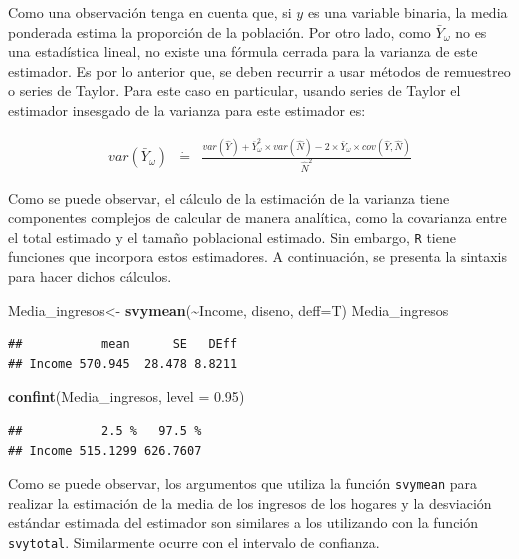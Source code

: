 \documentclass[
  spanish,
  12pt,
]{book}
\newenvironment{Shaded}{\begin{snugshade}}{\end{snugshade}}
\newcommand{\AttributeTok}[1]{\textcolor[rgb]{0.13,0.29,0.53}{#1}}
\newcommand{\FloatTok}[1]{\textcolor[rgb]{0.00,0.00,0.81}{#1}}
\newcommand{\FunctionTok}[1]{\textcolor[rgb]{0.13,0.29,0.53}{\textbf{#1}}}
\newcommand{\NormalTok}[1]{#1}
\newcommand{\OtherTok}[1]{\textcolor[rgb]{0.56,0.35,0.01}{#1}}
\newcommand{\SpecialCharTok}[1]{\textcolor[rgb]{0.81,0.36,0.00}{\textbf{#1}}}
\begin{document}
Como una observación tenga en cuenta que, si \(y\) es una variable
binaria, la media ponderada estima la proporción de la población.
Por otro lado, como \(\bar{Y}_{\omega}\) no es una estadística lineal,
no existe una fórmula cerrada para la varianza de este estimador.
Es por lo anterior que, se deben recurrir a usar métodos de remuestreo
o series de Taylor. Para este caso en particular, usando series de
Taylor el estimador insesgado de la varianza para este estimador es:

\begin{eqnarray*}
var\left(\bar{Y}_{\omega}\right) & \dot{=} & \frac{var\left(\hat{Y}\right)+\bar{Y}_{\omega}^{2}\times var\left(\hat{N}\right)-2\times\bar{Y}_{\omega}\times cov\left(\hat{Y},\hat{N}\right)}{\hat{N}^{2}}
\end{eqnarray*}

Como se puede observar, el cálculo de la estimación de la varianza tiene componentes complejos de calcular de manera analítica, como la covarianza entre el total estimado y el tamaño poblacional estimado. Sin embargo, \texttt{R} tiene funciones que incorpora estos estimadores. A continuación, se presenta la sintaxis para hacer dichos cálculos.

\begin{Shaded}
\begin{Highlighting}[]
\NormalTok{Media\_ingresos}\OtherTok{\textless{}{-}} \FunctionTok{svymean}\NormalTok{(}\SpecialCharTok{\textasciitilde{}}\NormalTok{Income, diseno, }\AttributeTok{deff=}\NormalTok{T)}
\NormalTok{Media\_ingresos}
\end{Highlighting}
\end{Shaded}

\begin{verbatim}
##           mean      SE   DEff
## Income 570.945  28.478 8.8211
\end{verbatim}

\begin{Shaded}
\begin{Highlighting}[]
\FunctionTok{confint}\NormalTok{(Media\_ingresos, }\AttributeTok{level =} \FloatTok{0.95}\NormalTok{)}
\end{Highlighting}
\end{Shaded}

\begin{verbatim}
##           2.5 %   97.5 %
## Income 515.1299 626.7607
\end{verbatim}

Como se puede observar, los argumentos que utiliza la función \texttt{svymean} para realizar la estimación de la media de los ingresos de los hogares y la desviación estándar estimada del estimador son similares a los utilizando con la función \texttt{svytotal}. Similarmente ocurre con el intervalo de confianza.
\end{document}
